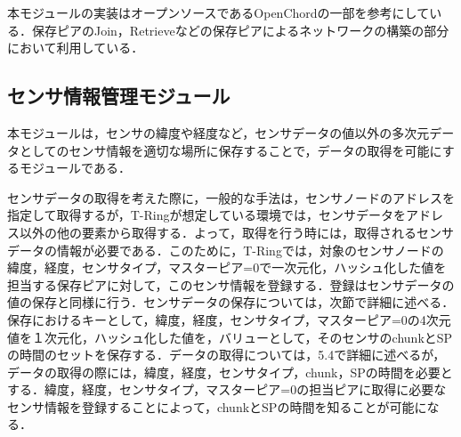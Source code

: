 本モジュールの実装はオープンソースであるOpenChordの一部を参考にしている．保存ピアのJoin，Retrieveなどの保存ピアによるネットワークの構築の部分において利用している．

\subsection{センサ情報管理モジュール}
本モジュールは，センサの緯度や経度など，センサデータの値以外の多次元データとしてのセンサ情報を適切な場所に保存することで，データの取得を可能にするモジュールである．

センサデータの取得を考えた際に，一般的な手法は，センサノードのアドレスを指定して取得するが，T-Ringが想定している環境では，センサデータをアドレス以外の他の要素から取得する．よって，取得を行う時には，取得されるセンサデータの情報が必要である．このために，T-Ringでは，対象のセンサノードの緯度，経度，センサタイプ，マスターピア=0で一次元化，ハッシュ化した値を担当する保存ピアに対して，このセンサ情報を登録する．登録はセンサデータの値の保存と同様に行う．センサデータの保存については，次節で詳細に述べる．保存におけるキーとして，緯度，経度，センサタイプ，マスターピア=0の4次元値を１次元化，ハッシュ化した値を，バリューとして，そのセンサのchunkとSPの時間のセットを保存する．データの取得については，5.4で詳細に述べるが，データの取得の際には，緯度，経度，センサタイプ，chunk，SPの時間を必要とする．緯度，経度，センサタイプ，マスターピア=0の担当ピアに取得に必要なセンサ情報を登録することによって，chunkとSPの時間を知ることが可能になる．

